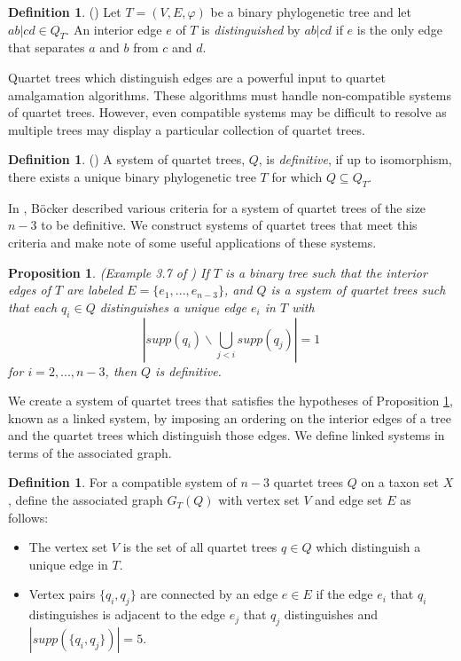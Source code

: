 \documentclass[final,3p,times]{elsarticle}
\newtheorem{prop}[thm]{Proposition}
\theoremstyle{definition}
\newtheorem{defn}[thm]{Definition}
\theoremstyle{remark}
\begin{document}
\begin{defn}
(\cite{semple}) Let $T = (V,E,\varphi)$ be a binary phylogenetic tree and let $ab|cd \in Q_T$. An interior edge $e$ of $T$ is \emph{distinguished} by $ab|cd$ if $e$ is the only edge that separates $a$ and $b$ from $c$ and $d$.  
\end{defn}

Quartet trees which distinguish edges are a powerful input to quartet amalgamation algorithms. These algorithms must handle non-compatible systems of quartet trees.  However, even compatible systems may be difficult to resolve as multiple trees may display a particular collection of quartet trees.

\begin{defn} (\protect\cite{steel})
A system of quartet trees, $Q$, is \emph{definitive}, if up to isomorphism, there exists a unique binary phylogenetic tree $T$ for which $Q \subseteq Q_T$. 
\end{defn}


In \cite{bocker1998}, B{\"o}cker described various criteria for a system of quartet trees of the size $n-3$ to be definitive. We construct systems of quartet trees that meet this criteria and make note of some useful applications of these systems. 

\begin{prop} 
(Example 3.7 of \cite{bocker1998})
If $T$ is a binary tree such that the interior edges of $T$ are labeled $E=\{e_1,...,e_{n-3}\}$, and $Q$ is a system of quartet trees such that each $q_i \in Q$ distinguishes a unique edge $e_i$ in $T$ with \[|supp(q_i)\backslash \bigcup_{j<i} supp(q_j)|= 1\] for $i=2,...,n-3$, then $Q$ is definitive. 
\label{bocker2}
\end{prop}

We create a system of quartet trees that satisfies the hypotheses of Proposition \ref{bocker2}, known as a linked system, by imposing an ordering on the interior edges of a tree and the quartet trees which distinguish those edges. We define linked systems in terms of the associated graph. 

\begin{defn}
For a compatible system of $n-3$ quartet trees $Q$ on a taxon set $X$, define the associated graph $G_T(Q)$ with vertex set $V$ and edge set $E$ as follows:
\begin{itemize}
\item The vertex set $V$ is the set of all quartet trees $q \in Q$ which distinguish a unique edge in $T$. 
\item Vertex pairs $\{q_i,q_j\}$ are connected by an edge $e \in E$ if the edge $e_i$ that $q_i$ distinguishes is adjacent to the edge $e_j$ that $q_j$ distinguishes and $|supp(\{q_i,q_j\})|=5$.
\end{itemize}
\label{order}
\end{defn}
\end{document}
